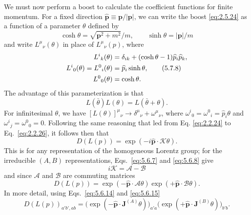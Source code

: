 We must now perform a boost to calculate the coefficient functions for finite
momentum. For a fixed direction $\widehat{\mathbf p}\equiv
\mathbf p/|\mathbf p|$, we can write the boost \eqref{eq:2.5.24} as a function of a
parameter $\theta$ defined by
\begin{equation}
\cosh\theta=\sqrt{\mathbf p^2+m^2}/m,
\qquad \sinh\theta=|\mathbf p|/m
\tag{5.7.7}\label{eq:5.7.7}
\end{equation}
and write $L^\mu{}_\nu(\theta)$ in place of $L^\mu{}_\nu(p)$, where
\begin{align}
L^i{}_k(\theta)&=\delta_{ik}+(\cosh\theta-1)\widehat p_i\widehat p_k,
\notag\\
L^i{}_0(\theta)=L^0{}_i(\theta)&=\widehat p_i\sinh\theta,
\tag{5.7.8}\label{eq:5.7.8}\\
L^0{}_0(\theta)&=\cosh\theta.
\notag
\end{align}
The advantage of this parameterization is that
\begin{equation}
L(\bar\theta)L(\theta)=L(\bar\theta+\theta).
\tag{5.7.9}\label{eq:5.7.9}
\end{equation}
For infinitesimal $\theta$, we have
$[L(\theta)]^\mu{}_\nu\to\delta^\mu{}_\nu+\omega^\mu{}_\nu$, where
$\omega^i{}_0=\omega^0{}_i=\widehat p_i\theta$ and
$\omega^i{}_j=\omega^0{}_0=0$. Following the same reasoning that led from Eq.
\eqref{eq:2.2.24} to Eq.~\eqref{eq:2.2.26}, it follows then that
\begin{equation}
D(L(p))=\exp(-i\widehat{\mathbf p}\cdot\boldsymbol{\mathcal K}\theta).
\tag{5.7.10}\label{eq:5.7.10}
\end{equation}
This is for any representation of the homogeneous Lorentz group; for the
irreducible $(A,B)$ representations, Eqs.~\eqref{eq:5.6.7} and \eqref{eq:5.6.8} give
\begin{equation}
i\boldsymbol{\mathcal K}=\boldsymbol{\mathcal A}-\boldsymbol{\mathcal B}
\tag{5.7.11}\label{eq:5.7.11}
\end{equation}
and since $\boldsymbol{\mathcal A}$ and $\boldsymbol{\mathcal B}$ are commuting
matrices
\begin{equation}
D(L(p))=\exp(-\widehat{\mathbf p}\cdot\boldsymbol{\mathcal A}\theta)
\exp(+\widehat{\mathbf p}\cdot\boldsymbol{\mathcal B}\theta).
\tag{5.7.12}\label{eq:5.7.12}
\end{equation}
In more detail, using Eqs.~\eqref{eq:5.6.14} and \eqref{eq:5.6.15}
\begin{equation}
D(L(p))_{a'b',ab}=
\bigl(\exp(-\widehat{\mathbf p}\cdot\mathbf J^{(A)}\theta)\bigr)_{a'a}
\bigl(\exp(+\widehat{\mathbf p}\cdot\mathbf J^{(B)}\theta)\bigr)_{b'b}.
\tag{5.7.13}\label{eq:5.7.13}
\end{equation}
